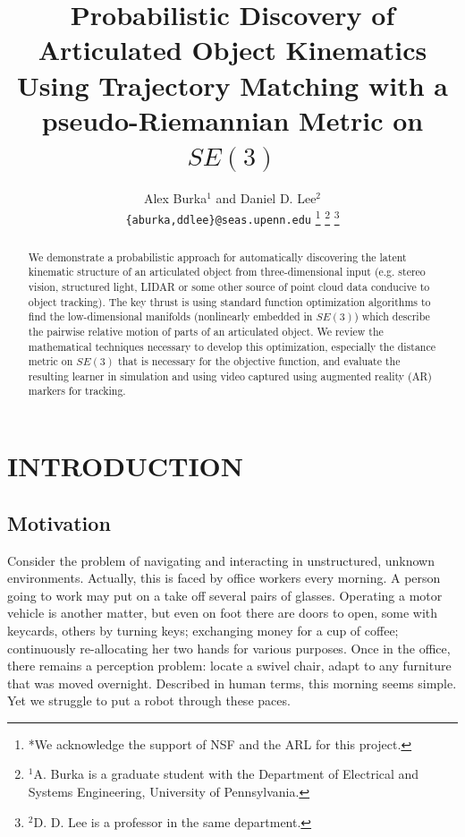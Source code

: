 \documentclass[letterpaper, 10 pt, conference]{ieeeconf}  %
\title{\LARGE \bf
Probabilistic Discovery of Articulated Object Kinematics Using Trajectory Matching with a pseudo-Riemannian Metric on $SE(3)$
}
\author{Alex Burka$^{1}$ and Daniel D. Lee$^{2}$ \\ {\tt\small\{aburka,ddlee\}@seas.upenn.edu}
\thanks{*We acknowledge the support of NSF and the ARL for this project.}%
\thanks{$^{1}$A. Burka is a graduate student with the Department of Electrical and Systems Engineering, University of Pennsylvania.}%
\thanks{$^{2}$D. D. Lee is a professor in the same department.}%
}
\begin{document}
\maketitle
\thispagestyle{empty}
\pagestyle{empty}


\begin{abstract}

  We demonstrate a probabilistic approach for automatically discovering the latent kinematic structure of an articulated object from three-dimensional input (e.g. stereo vision, structured light, LIDAR or some other source of point cloud data conducive to object tracking).  The key thrust is using standard function optimization algorithms to find the low-dimensional manifolds (nonlinearly embedded in $SE(3)$) which describe the pairwise relative motion of parts of an articulated object. We review the mathematical techniques necessary to develop this optimization, especially the distance metric on $SE(3)$ that is necessary for the objective function, and evaluate the resulting learner in simulation and using video captured using augmented reality (AR) markers for tracking.

\end{abstract}


\section{INTRODUCTION}

\subsection{Motivation}
Consider the problem of navigating and interacting in unstructured, unknown environments. Actually, this is faced by office workers every morning. A person going to work may put on a take off several pairs of glasses. Operating a motor vehicle is another matter, but even on foot there are doors to open, some with keycards, others by turning keys; exchanging money for a cup of coffee; continuously re-allocating her two hands for various purposes. Once in the office, there remains a perception problem: locate a swivel chair, adapt to any furniture that was moved overnight. Described in human terms, this morning seems simple. Yet we struggle to put a robot through these paces.
\end{document}
